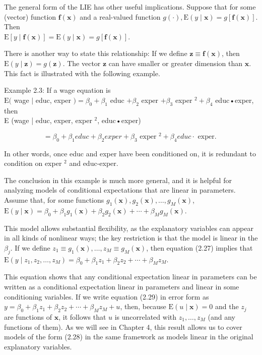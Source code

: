 \documentclass[10pt]{article}
\begin{document}
The general form of the LIE has other useful implications. Suppose that for some (vector) function $\mathbf{f}(\mathbf{x})$ and a real-valued function $g(\cdot), \mathrm{E}(y \mid \mathbf{x})=g[\mathbf{f}(\mathbf{x})]$. Then\\
$\mathrm{E}[y \mid \mathbf{f}(\mathbf{x})]=\mathrm{E}(y \mid \mathbf{x})=g[\mathbf{f}(\mathbf{x})]$.

There is another way to state this relationship: If we define $\mathbf{z} \equiv \mathbf{f}(\mathbf{x})$, then $\mathrm{E}(y \mid \mathbf{z})= g(\mathbf{z})$. The vector $\mathbf{z}$ can have smaller or greater dimension than $\mathbf{x}$. This fact is illustrated with the following example.

Example 2.3: If a wage equation is\\
$\mathrm{E}($ wage $\mid$ educ, exper $)=\beta_{0}+\beta_{1}$ educ $+\beta_{2}$ exper $+\beta_{3}$ exper ${ }^{2}+\beta_{4}$ educ•exper,\\
then\\
E (wage | educ, exper, exper ${ }^{2}$, educ•exper)

$$
=\beta_{0}+\beta_{1} e d u c+\beta_{2} e x p e r+\beta_{3} \text { exper }^{2}+\beta_{4} e d u c \cdot \text { exper. }
$$

In other words, once educ and exper have been conditioned on, it is redundant to condition on exper ${ }^{2}$ and educ-exper.

The conclusion in this example is much more general, and it is helpful for analyzing models of conditional expectations that are linear in parameters. Assume that, for some functions $g_{1}(\mathbf{x}), g_{2}(\mathbf{x}), \ldots, g_{M}(\mathbf{x})$,\\
$\mathrm{E}(y \mid \mathbf{x})=\beta_{0}+\beta_{1} g_{1}(\mathbf{x})+\beta_{2} g_{2}(\mathbf{x})+\cdots+\beta_{M} g_{M}(\mathbf{x})$.

This model allows substantial flexibility, as the explanatory variables can appear in all kinds of nonlinear ways; the key restriction is that the model is linear in the $\beta_{j}$. If we define $z_{1} \equiv g_{1}(\mathbf{x}), \ldots, z_{M} \equiv g_{M}(\mathbf{x})$, then equation (2.27) implies that\\
$\mathrm{E}\left(y \mid z_{1}, z_{2}, \ldots, z_{M}\right)=\beta_{0}+\beta_{1} z_{1}+\beta_{2} z_{2}+\cdots+\beta_{M} z_{M}$.

This equation shows that any conditional expectation linear in parameters can be written as a conditional expectation linear in parameters and linear in some conditioning variables. If we write equation (2.29) in error form as $y=\beta_{0}+\beta_{1} z_{1}+ \beta_{2} z_{2}+\cdots+\beta_{M} z_{M}+u$, then, because $\mathrm{E}(u \mid \mathbf{x})=0$ and the $z_{j}$ are functions of $\mathbf{x}$, it follows that $u$ is uncorrelated with $z_{1}, \ldots, z_{M}$ (and any functions of them). As we will see in Chapter 4, this result allows us to cover models of the form (2.28) in the same framework as models linear in the original explanatory variables.
\end{document}
